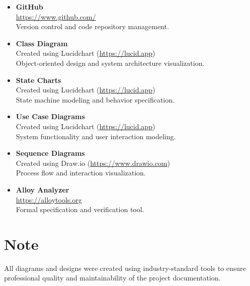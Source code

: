 \documentclass[12pt,a4paper,oneside]{book}
\begin{document}
\begin{itemize}
    \item \textbf{GitHub} \\
    \url{https://www.github.com/} \\
    Version control and code repository management.
    
    \item \textbf{Class Diagram} \\
    Created using Lucidchart (\url{https://lucid.app}) \\
    Object-oriented design and system architecture visualization.
    
    \item \textbf{State Charts} \\
    Created using Lucidchart (\url{https://lucid.app}) \\
    State machine modeling and behavior specification.
    
    \item \textbf{Use Case Diagrams} \\
    Created using Lucidchart (\url{https://lucid.app}) \\
    System functionality and user interaction modeling.
    
    \item \textbf{Sequence Diagrams} \\
    Created using Draw.io (\url{https://www.drawio.com}) \\
    Process flow and interaction visualization.
    
    \item \textbf{Alloy Analyzer} \\
    \url{https://alloytools.org} \\
    Formal specification and verification tool.
\end{itemize}

\section*{Note}
All diagrams and designs were created using industry-standard tools to ensure professional quality and maintainability of the project documentation.

% 

\cleardoublepage
{}

\cleardoublepage
\end{document}
